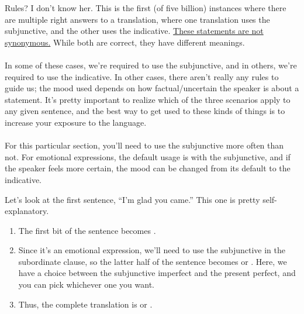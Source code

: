 \begin{conf}{Rules? I don't know her.}
	This is the first (of five billion) instances where there are multiple right answers to a translation, where one translation uses the subjunctive, and the other uses the indicative. \underline{These statements are not synonymous.} While both are correct, they have different meanings. \\
	
\\	In some of these cases, we're required to use the subjunctive, and in others, we're required to use the indicative. In other cases, there aren't really any rules to guide us; the mood used depends on how factual/uncertain the speaker is about a statement. It's pretty important to realize which of the three scenarios apply to any given sentence, and the best way to get used to these kinds of things is to increase your exposure to the language. \\

\\ For this particular section, you'll need to use the subjunctive more often than not. For emotional expressions, the default usage is with the subjunctive, and if the speaker feels more certain, the mood can be changed from its default to the indicative. 
\end{conf}

Let's look at the first sentence, ``I'm glad you came.'' This one is pretty self-explanatory. 
\begin{enumerate}
	\item The first bit of the sentence becomes . 
	\item Since it's an emotional expression, we'll need to use the subjunctive in the subordinate clause, so the latter half of the sentence becomes  or . Here, we have a choice between the subjunctive imperfect and the present perfect, and you can pick whichever one you want. 
	\item Thus, the complete translation is  or .
\end{enumerate}

